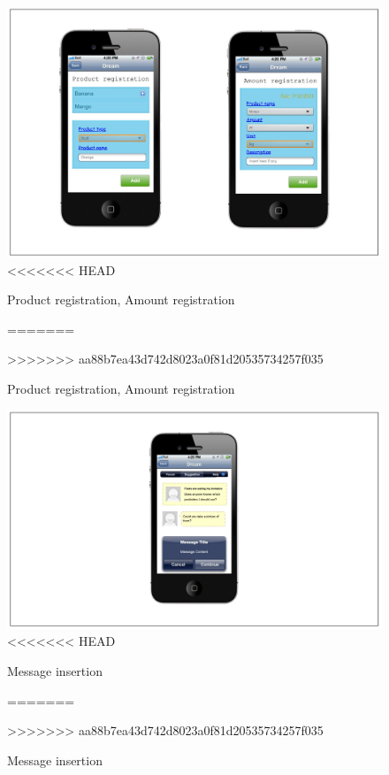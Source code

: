 \begin{figure}[H]
	\centering
    \includegraphics[page=1, width=\textwidth]{Images/product_amount_registration.JPG}
<<<<<<< HEAD
	\caption{\label{fig:FE_image2}Product registration, Amount registration}
=======
	\caption{\label{fig:FE_image}Product registration, Amount registration}
>>>>>>> aa88b7ea43d742d8023a0f81d20535734257f035
\end{figure}



\begin{figure}[H]
	\centering
    \includegraphics[page=1, width=\textwidth]{Images/message_insertion.JPG}
<<<<<<< HEAD
	\caption{\label{fig:FE_image3}Message insertion}
=======
	\caption{\label{fig:FE_image}Message insertion}
>>>>>>> aa88b7ea43d742d8023a0f81d20535734257f035
\end{figure}

